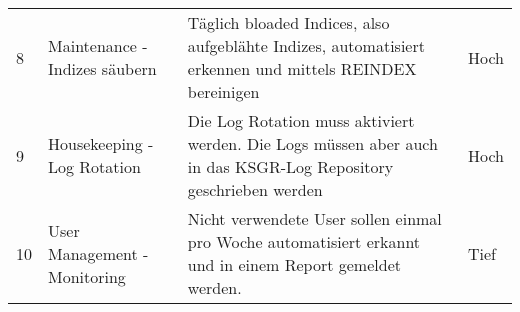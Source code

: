 \begin{table}[H]
{\begin{tabular}{@{}llll@{}}
8            & Maintenance - Indizes säubern                     & Täglich bloaded Indices, also aufgeblähte Indizes, automatisiert erkennen und mittels REINDEX bereinigen                                                                                                                                                                                                                                                                                                                                                                                                                                                                                                                                                                                                                                                                                                                                                                             & Hoch               \\
9            & Housekeeping - Log Rotation                       & Die Log Rotation muss aktiviert werden. Die Logs müssen aber auch in das KSGR-Log Repository geschrieben werden                                                                                                                                                                                                                                                                                                                                                                                                                                                                                                                                                                                                                                                                                                                                                                      & Hoch               \\
10           & User Management - Monitoring                      & Nicht verwendete User sollen einmal pro Woche automatisiert erkannt und in einem Report gemeldet werden.                                                                                                                                                                                                                                                                                                                                                                                                                                                                                                                                                                                                                                                                                                                                                                             & Tief               \\

\end{tabular}}
\end{table}
